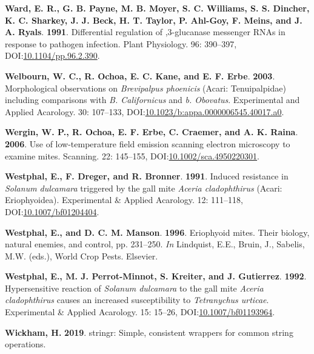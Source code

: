 \documentclass[12pt,final,CPage]{ufthesis}
\newlength{\cslhangindent}
\newenvironment{CSLReferences}[2] %
{%
	\setlength{\parindent}{0pt}
	\ifodd #1 \everypar{\setlength{\hangindent}{\cslhangindent}}\ignorespaces\fi
	\ifnum #2 > 0
	\setlength{\parskip}{#2\baselineskip}
	\fi
}%
{}
\begin{document}
{\begin{CSLReferences}{1}{0}
  \leavevmode{}%
  \textbf{Ward, E. R., G. B. Payne, M. B. Moyer, S. C. Williams, S. S. Dincher, K. C. Sharkey, J. J. Beck, H. T. Taylor, P. Ahl-Goy, F. Meins, and J. A. Ryals}. \textbf{1991}. Differential regulation of ,3-glucanase messenger {RNAs} in response to pathogen infection. Plant Physiology. 96: 390--397, DOI:\href{https://doi.org/10.1104/pp.96.2.390}{10.1104/pp.96.2.390}.

  \leavevmode{}%
  \textbf{Welbourn, W. C., R. Ochoa, E. C. Kane, and E. F. Erbe}. \textbf{2003}. Morphological observations on {\emph{Brevipalpus phoenicis}} ({Acari}: {Tenuipalpidae}) including comparisons with {\emph{B. Californicus}} and {\emph{b. Obovatus}}. Experimental and Applied Acarology. 30: 107--133, DOI:\href{https://doi.org/10.1023/b:appa.0000006545.40017.a0}{10.1023/b:appa.0000006545.40017.a0}.

  \leavevmode{}%
  \textbf{Wergin, W. P., R. Ochoa, E. F. Erbe, C. Craemer, and A. K. Raina}. \textbf{2006}. Use of low-temperature field emission scanning electron microscopy to examine mites. Scanning. 22: 145--155, DOI:\href{https://doi.org/10.1002/sca.4950220301}{10.1002/sca.4950220301}.

  \leavevmode{}%
  \textbf{Westphal, E., F. Dreger, and R. Bronner}. \textbf{1991}. Induced resistance in {\emph{Solanum dulcamara}} triggered by the gall mite {\emph{Aceria cladophthirus}} ({Acari}: {Eriophyoidea}). Experimental {\&} Applied Acarology. 12: 111--118, DOI:\href{https://doi.org/10.1007/bf01204404}{10.1007/bf01204404}.

  \leavevmode{}%
  \textbf{Westphal, E., and D. C. M. Manson}. \textbf{1996}. Eriophyoid mites. Their biology, natural enemies, and control, pp. 231--250. \emph{In} Lindquist, E.E., Bruin, J., Sabelis, M.W. (eds.), World Crop Pests. Elsevier.

  \leavevmode{}%
  \textbf{Westphal, E., M. J. Perrot-Minnot, S. Kreiter, and J. Gutierrez}. \textbf{1992}. Hypersensitive reaction of {\emph{Solanum dulcamara}} to the gall mite {\emph{Aceria cladophthirus}} causes an increased susceptibility to {\emph{Tetranychus urticae}}. Experimental {\&} Applied Acarology. 15: 15--26, DOI:\href{https://doi.org/10.1007/bf01193964}{10.1007/bf01193964}.

  \leavevmode{}%
  \textbf{Wickham, H.} \textbf{2019}. {stringr}: Simple, consistent wrappers for common string operations.


\end{CSLReferences}}
\end{document}
